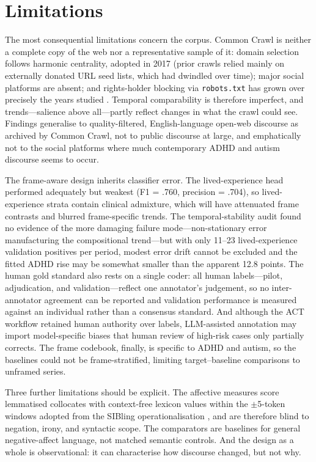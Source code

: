\section{Limitations}
\label{sec:discussion-limitations}

The most consequential limitations concern the corpus. Common Crawl is neither a complete copy of the web nor a representative sample of it: domain selection follows harmonic centrality, adopted in 2017 (prior crawls relied mainly on externally donated URL seed lists, which had dwindled over time); major social platforms are absent; and rights-holder blocking via \texttt{robots.txt} has grown over precisely the years studied \citep{baackCriticalAnalysisLargest2024}. Temporal comparability is therefore imperfect, and trends---salience above all---partly reflect changes in what the crawl could see. Findings generalise to quality-filtered, English-language open-web discourse as archived by Common Crawl, not to public discourse at large, and emphatically not to the social platforms where much contemporary ADHD and autism discourse seems to occur.

The frame-aware design inherits classifier error. The lived-experience head performed adequately but weakest (F1 = .760, precision = .704), so lived-experience strata contain clinical admixture, which will have attenuated frame contrasts and blurred frame-specific trends. The temporal-stability audit found no evidence of the more damaging failure mode---non-stationary error manufacturing the compositional trend---but with only 11--23 lived-experience validation positives per period, modest error drift cannot be excluded and the fitted ADHD rise may be somewhat smaller than the apparent 12.8 points. The human gold standard also rests on a single coder: all human labels---pilot, adjudication, and validation---reflect one annotator's judgement, so no inter-annotator agreement can be reported and validation performance is measured against an individual rather than a consensus standard. And although the ACT workflow retained human authority over labels, LLM-assisted annotation may import model-specific biases that human review of high-risk cases only partially corrects. The frame codebook, finally, is specific to ADHD and autism, so the baselines could not be frame-stratified, limiting target–baseline comparisons to unframed series.

Three further limitations should be explicit. The affective measures score lemmatised collocates with context-free lexicon values within the \(\pm\)5-token windows adopted from the SIBling operationalisation \citep{baesMultidimensionalFrameworkEvaluating2024}, and are therefore blind to negation, irony, and syntactic scope. The comparators are baselines for general negative-affect language, not matched semantic controls. And the design as a whole is observational: it can characterise how discourse changed, but not why. 

